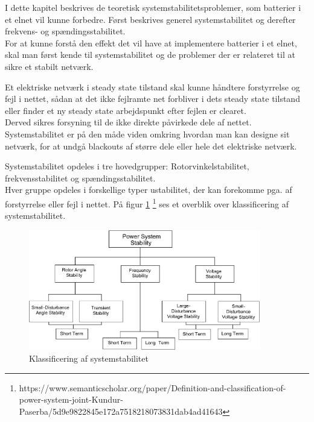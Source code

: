 
\label{Systemstabilitet}
I dette kapitel beskrives de teoretisk systemstabilitetsproblemer, som batterier i et elnet vil kunne forbedre. Først beskrives generel systemstabilitet og derefter frekvens- og spændingsstabilitet.\\

For at kunne forstå den effekt det vil have at implementere batterier i et elnet, skal man først kende til systemstabilitet og de problemer der er relateret til at sikre et stabilt netværk.

Et elektriske netværk i steady state tilstand skal kunne håndtere forstyrrelse og fejl i nettet, sådan at det ikke fejlramte net forbliver i dets steady state tilstand eller finder et ny steady state arbejdspunkt efter fejlen er clearet.\\
Derved sikres forsyning til de ikke direkte påvirkede dele af nettet. Systemstabilitet er på den måde viden omkring hvordan man kan designe sit netværk, for at undgå blackouts af større dele eller hele det elektriske netværk.

Systemstabilitet opdeles i tre hovedgrupper: Rotorvinkelstabilitet, frekvensstabilitet og spændingsstabilitet.\\
Hver gruppe opdeles i forskellige typer ustabilitet, der kan forekomme pga. af forstyrrelse eller fejl i nettet. På figur \ref{fig:Overview}
\footnote{https://www.semanticscholar.org/paper/Definition-and-classification-of-power-system-joint-Kundur-Paserba/5d9e9822845e172a7518218073831dab4ad41643}
ses et overblik over klassificering af systemstabilitet.

\begin{figure}[H] %
	\centering
	\includegraphics[width=0.9\textwidth]{figurer/Classification_of_power_system_stability}
	\caption{Klassificering af systemstabilitet}
	\label{fig:Overview}
\end{figure}

